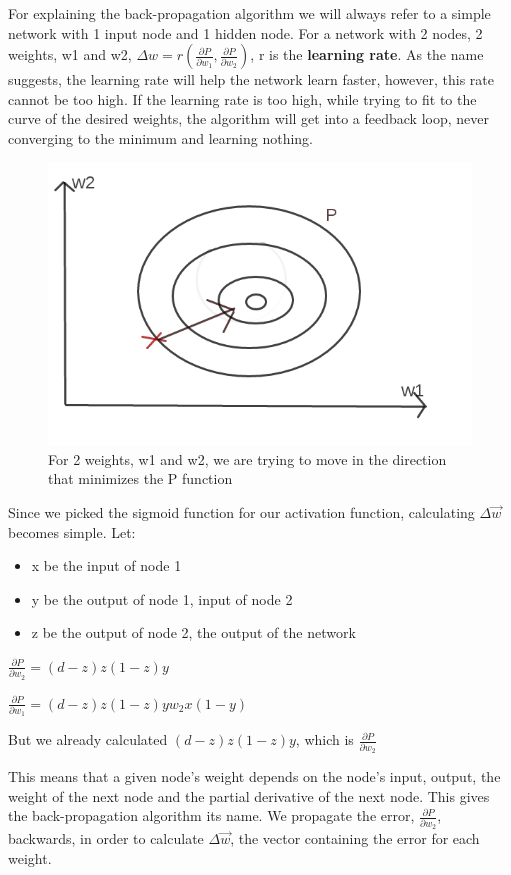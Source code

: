 \documentclass[11pt]{article}
\begin{document}
For explaining the back-propagation algorithm we will always refer to a simple network with 1 input node and 1 hidden node.
For a network with 2 nodes, 2 weights, w1 and w2, $\Delta w = r(\frac{\partial P}{\partial w_1} , \frac{\partial P}{\partial w_2})$, r is the \textbf{learning rate}. As the name suggests, the learning rate will help the network learn faster, however, this rate cannot be too high. If the learning rate is too high, while trying to fit to the curve of the desired weights, the algorithm will get into a feedback loop, never converging to the minimum and learning nothing.
\begin{figure}[H]
\label{fig:example}
\includegraphics[scale=0.3]{performance.png}
\centering
\caption{For 2 weights, w1 and w2, we are trying to move in the direction that minimizes the P function}
\end{figure}
Since we picked the sigmoid function for our activation function, calculating $\Delta \overrightarrow{w}$ becomes simple.
Let:
\begin{itemize}
\item x be the input of node 1
\item y be the output of node 1, input of node 2
\item z be the output of node 2, the output of the network
\end{itemize}

$\frac{\partial P}{\partial w_2} = (d-z)z(1-z)y$

$\frac{\partial P}{\partial w_1} = (d-z)z(1-z)yw_2x(1-y)$

But we already calculated $(d-z)z(1-z)y$, which is $\frac{\partial P}{\partial w_2}$

This means that a given node's weight depends on the node's input, output, the weight of the next node and the partial derivative of the next node.
This gives the back-propagation algorithm its name. We propagate the error, $\frac{\partial P}{\partial w_2}$, backwards, in order to calculate $\Delta \overrightarrow{w}$, the vector containing the error for each weight.
\end{document}
